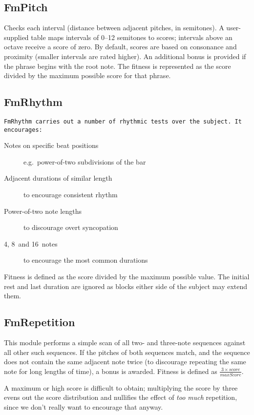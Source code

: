 \subsection{FmPitch}

Checks each interval (distance between adjacent pitches, in semitones). A user-supplied table maps intervals of 0--12 semitones to scores; intervals above an octave receive a score of zero. By default, scores are based on consonance and proximity (smaller intervals are rated higher). An additional bonus is provided if the phrase begins with the root note. The fitness is represented as the score divided by the maximum possible score for that phrase.

\subsection{FmRhythm}

\tt{FmRhythm} carries out a number of rhythmic tests over the subject. It encourages:

\begin{description}
	\item[Notes on specific beat positions] e.g.\ power-of-two subdivisions of the bar
	\item[Adjacent durations of similar length] to encourage consistent rhythm
	\item[Power-of-two note lengths] to discourage overt syncopation
	\item[4\th, 8\th\ and 16\th\ notes] to encourage the most common durations
\end{description}

Fitness is defined as the score divided by the maximum possible value. The initial rest and last duration are ignored as blocks either side of the subject may extend them.

\subsection{FmRepetition}

This module performs a simple scan of all two- and three-note sequences against all other such sequences. If the pitches of both sequences match, and the sequence does not contain the same adjacent note twice (to discourage repeating the same note for long lengths of time), a bonus is awarded. Fitness is defined as $\frac{3 \times score}{maxScore}$.

A maximum or high score is difficult to obtain; multiplying the score by three evens out the score distribution and nullifies the effect of \emph{too much} repetition, since we don't really want to encourage that anyway.

